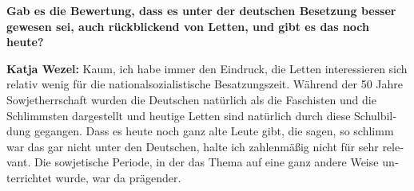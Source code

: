 \begin{otherlanguage}{ngerman}

\textbf{Gab es die Bewertung, dass es unter der deutschen Besetzung besser gewesen sei, auch rückblickend von Letten, und gibt es das noch heute?} 

\textbf{Katja Wezel:} Kaum, ich habe immer den Eindruck, die Letten interessieren sich relativ wenig für die nationalsozialistische Besatzungszeit. Während der 50 Jahre Sowjetherrschaft wurden die Deutschen natürlich als die Faschisten und die Schlimmsten dargestellt und heutige Letten sind natürlich durch diese Schulbildung gegangen. Dass es heute noch ganz alte Leute gibt, die sagen, so schlimm war das gar nicht unter den Deutschen, halte ich zahlenmäßig nicht für sehr relevant. Die sowjetische Periode, in der das Thema auf eine ganz andere Weise unterrichtet wurde, war da prägender. 


\end{otherlanguage}

